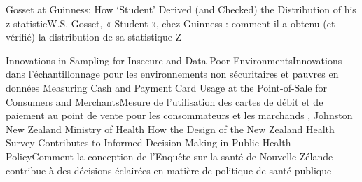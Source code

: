 {
}
{Gosset at Guinness: How ‘Student’ Derived (and Checked) the Distribution of his z-statistic}{W.S. Gosset, « Student », chez Guinness : comment il a obtenu (et vérifié) la distribution de sa statistique Z}
{\bubbleE \enspace \screenE}



{
}
{Innovations in Sampling for Insecure and Data-Poor Environments}{Innovations dans l’échantillonnage pour les environnements non sécuritaires et pauvres en données}
{\bubbleE \enspace \screenE}
{
}
{Measuring Cash and Payment Card Usage at the Point-of-Sale for Consumers and Merchants}{Mesure de l’utilisation des cartes de débit et de paiement au point de vente pour les consommateurs et les marchands }
{\bubbleE \enspace \screenE}
{
,  {Johnston}
{New Zealand Ministry of Health}
}
{How the Design of the New Zealand Health Survey Contributes to Informed Decision Making in Public Health Policy}{Comment la conception de l’Enquête sur la santé de Nouvelle-Zélande contribue à des décisions éclairées en matière de politique de santé publique}
{\bubbleE \enspace \screenE}


